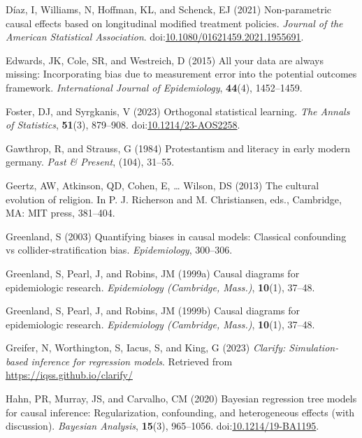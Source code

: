 \documentclass[
  singlecolumn]{article}
\newlength{\cslhangindent}
\newenvironment{CSLReferences}[2] %
 {\begin{list}{}{%
  \setlength{\itemindent}{0pt}
  \setlength{\leftmargin}{0pt}
  \setlength{\parsep}{0pt}
  \ifodd #1
   \setlength{\leftmargin}{\cslhangindent}
   \setlength{\itemindent}{-1\cslhangindent}
  \fi
  \setlength{\itemsep}{#2\baselineskip}}}
 {\end{list}}
\begin{document}
\begin{CSLReferences}{1}{0}
Díaz, I, Williams, N, Hoffman, KL, and Schenck, EJ (2021) Non-parametric
causal effects based on longitudinal modified treatment policies.
\emph{Journal of the American Statistical Association}.
doi:\href{https://doi.org/10.1080/01621459.2021.1955691}{10.1080/01621459.2021.1955691}.

Edwards, JK, Cole, SR, and Westreich, D (2015) All your data are always
missing: Incorporating bias due to measurement error into the potential
outcomes framework. \emph{International Journal of Epidemiology},
\textbf{44}(4), 1452--1459.

Foster, DJ, and Syrgkanis, V (2023) Orthogonal statistical learning.
\emph{The Annals of Statistics}, \textbf{51}(3), 879--908.
doi:\href{https://doi.org/10.1214/23-AOS2258}{10.1214/23-AOS2258}.

Gawthrop, R, and Strauss, G (1984) Protestantism and literacy in early
modern germany. \emph{Past \& Present}, (104), 31--55.

Geertz, AW, Atkinson, QD, Cohen, E, \ldots{} Wilson, DS (2013) The
cultural evolution of religion. In P. J. Richerson and M. Christiansen,
eds., Cambridge, MA: MIT press, 381--404.

Greenland, S (2003) Quantifying biases in causal models: Classical
confounding vs collider-stratification bias. \emph{Epidemiology},
300--306.

Greenland, S, Pearl, J, and Robins, JM (1999a) Causal diagrams for
epidemiologic research. \emph{Epidemiology (Cambridge, Mass.)},
\textbf{10}(1), 37--48.

Greenland, S, Pearl, J, and Robins, JM (1999b) Causal diagrams for
epidemiologic research. \emph{Epidemiology (Cambridge, Mass.)},
\textbf{10}(1), 37--48.

Greifer, N, Worthington, S, Iacus, S, and King, G (2023) \emph{Clarify:
Simulation-based inference for regression models}. Retrieved from
\url{https://iqss.github.io/clarify/}

Hahn, PR, Murray, JS, and Carvalho, CM (2020) Bayesian regression tree
models for causal inference: Regularization, confounding, and
heterogeneous effects (with discussion). \emph{Bayesian Analysis},
\textbf{15}(3), 965--1056.
doi:\href{https://doi.org/10.1214/19-BA1195}{10.1214/19-BA1195}.


\end{CSLReferences}
\end{document}
